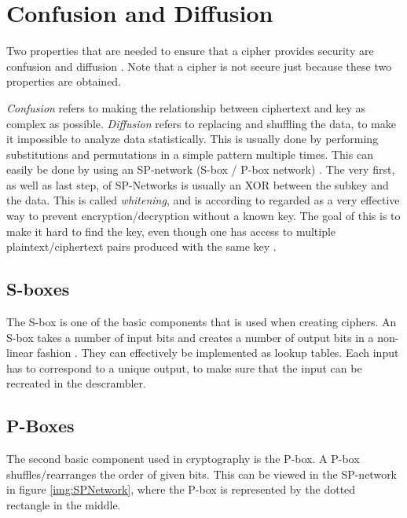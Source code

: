 
\section{Confusion and Diffusion}\label{ch:ConfDiff}
Two properties that are needed to ensure that a cipher provides security are 
confusion and diffusion \citep{Shannon:1949}. Note that a cipher is not secure 
just because these two properties are obtained.

\emph{Confusion} refers to making the relationship between ciphertext and key as 
complex as possible. \emph{Diffusion} refers to replacing and shuffling the 
data, to make it impossible to analyze data statistically. This is usually done 
by performing substitutions and permutations in a simple pattern multiple times. 
This can easily be done by using an SP-network (S-box / P-box network) 
\citep[pp. 74--79]{Stinson:2006}. The very first, as well as last step, of 
SP-Networks is usually an XOR between the subkey and the data. This is called 
\emph{whitening}, and is according to \citet[p. 75]{Stinson:2006} regarded as a 
very effective way to prevent encryption/decryption without a known key. 
The goal of this is to make it hard to find the key, even though one has access 
to multiple plaintext/ciphertext pairs produced with the same key 
\citep{Shannon:1949}.

\subsection{S-boxes}
The S-box is one of the basic components that is used when creating ciphers. 
An S-box takes a number of input bits and creates a number of output bits in 
a non-linear fashion \citep[pp. 74--75]{Stinson:2006}. They can effectively be 
implemented as lookup tables. Each input has to correspond to a unique output, 
to make sure that the input can be recreated in the descrambler.



\subsection{P-Boxes}
The second basic component used in cryptography is the P-box. A P-box 
shuffles/rearranges the order of given bits. This can be viewed in the 
SP-network in figure \ref{img:SPNetwork}, where the P-box is represented by the 
dotted rectangle in the middle.

